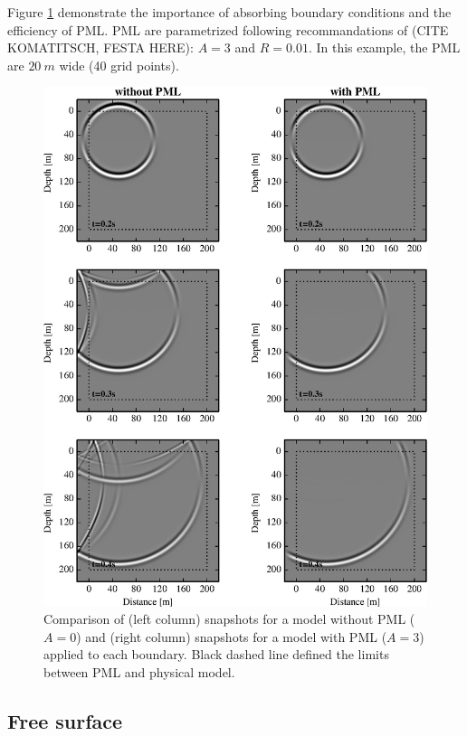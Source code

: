 \documentclass{gnulike}
\begin{document}
\noindent Figure \ref{fig:validation-pml} demonstrate the importance of absorbing boundary conditions and the efficiency of PML. PML are parametrized following recommandations of (CITE KOMATITSCH, FESTA HERE): $A=3$ and $R=0.01$. In this example, the PML are $20\ m$ wide (40 grid points).
\begin{figure}[!ht]
  \centering
  \includegraphics[scale=1.0]{fig/validation_pml.eps}
  \caption{Comparison of (left column) snapshots for a model without PML ($A=0$) and (right column) snapshots for a model with PML ($A=3$) applied to each boundary. Black dashed line defined the limits between PML and physical model.}
  \label{fig:validation-pml}
\end{figure}

\subsection{Free surface}
\end{document}
